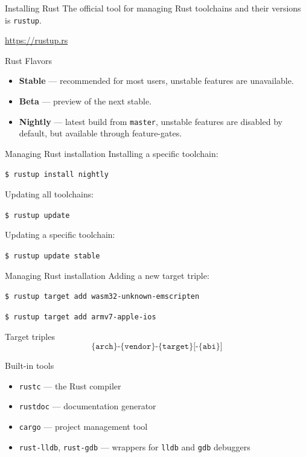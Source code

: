 \documentclass[12pt, aspectratio=169]{beamer}
\begin{document}
\begin{frame}{Installing Rust}
  The official tool for managing Rust toolchains and their versions is
  \texttt{rustup}.

  \url{https://rustup.rs}
\end{frame}

\begin{frame}{Rust Flavors}
  \begin{itemize}
    \item \textbf{Stable} --- recommended for most users, unstable features are
      unavailable.
    \item \textbf{Beta} --- preview of the next stable.
    \item \textbf{Nightly} --- latest build from \texttt{master}, unstable
      features are disabled by default, but available through feature-gates.
  \end{itemize}
\end{frame}

\begin{frame}{Managing Rust installation}
  Installing a specific toolchain:

  \texttt{\$ rustup install nightly}

  Updating all toolchains:

  \texttt{\$ rustup update}

  Updating a specific toolchain:

  \texttt{\$ rustup update stable}
\end{frame}

\begin{frame}{Managing Rust installation}
  Adding a new target triple:

  \texttt{\$ rustup target add wasm32-unknown-emscripten}

  \texttt{\$ rustup target add armv7-apple-ios}
\end{frame}

\begin{frame}{Target triples}
  \[\texttt{\{arch\}-\{vendor\}-\{target\}[-\{abi\}]}\]
\end{frame}

\begin{frame}{Built-in tools}
  \begin{itemize}
    \item \texttt{rustc} --- the Rust compiler
    \item \texttt{rustdoc} --- documentation generator
    \item \texttt{cargo} --- project management tool
    \item \texttt{rust-lldb}, \texttt{rust-gdb} --- wrappers for \texttt{lldb}
      and \texttt{gdb} debuggers
  \end{itemize}
\end{frame}
\end{document}
